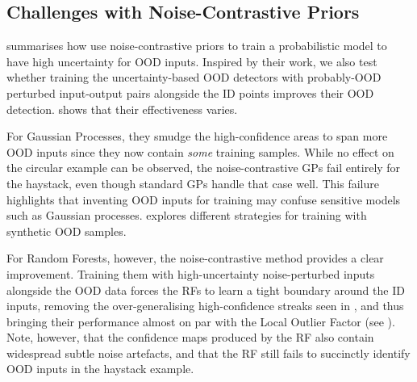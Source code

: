 \subsection{Challenges with Noise-Contrastive Priors} \label{txt:ood-detection-analysis-ncp}

 summarises how \textcite{noise-contrastive-uq-2020} use noise-contrastive priors to train a probabilistic model to have high uncertainty for OOD inputs. Inspired by their work, we also test whether training the uncertainty-based OOD detectors with probably-OOD perturbed input-output pairs alongside the ID points improves their OOD detection.  shows that their effectiveness varies.

For Gaussian Processes, they smudge the high-confidence areas to span more OOD inputs since they now contain \textit{some} training samples. While no effect on the circular example can be observed, the noise-contrastive GPs fail entirely for the haystack, even though standard GPs handle that case well. This failure highlights that inventing OOD inputs for training may confuse sensitive models such as Gaussian processes.  explores different strategies for training with synthetic OOD samples.

For Random Forests, however, the noise-contrastive method provides a clear improvement. Training them with high-uncertainty noise-perturbed inputs alongside the OOD data forces the RFs to learn a tight boundary around the ID inputs, removing the over-generalising high-confidence streaks seen in , and thus bringing their performance almost on par with the Local Outlier Factor (see ). Note, however, that the confidence maps produced by the RF also contain widespread subtle noise artefacts, and that the RF still fails to succinctly identify OOD inputs in the haystack example.

